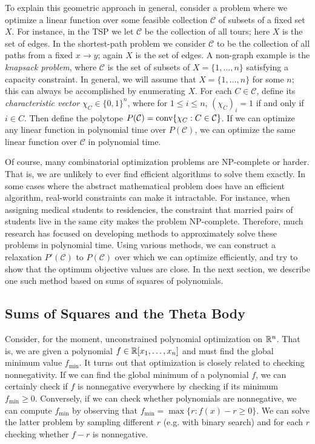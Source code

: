 To explain this geometric approach in general, consider a problem where we optimize a linear function over some feasible collection $\mathcal{C}$ of subsets of a fixed set $X$.
For instance, in the TSP we let $\mathcal{C}$ be the collection of all tours; here $X$ is the set of edges.
In the shortest-path problem we consider $\mathcal{C}$ to be the collection of all paths from a fixed $x \to y$; again $X$ is the set of edges.
A non-graph example is the {\em knapsack problem}, where $\mathcal{C}$ is the set of subsets of $X = \{1, \ldots, n\}$ satisfying a capacity constraint.
In general, we will assume that $X = \{1, \ldots, n\}$ for some $n$; this can always be accomplished by enumerating $X$.
For each $C \in \mathcal{C}$, define its {\em characteristic vector} $\chi_C \in \{0,1\}^n$, where for $1 \le i \le n$, $(\chi_C)_i = 1$ if and only if $i \in C$.
Then define the polytope $P(\mathcal{C}) = \hbox{conv} \{\chi_C: C \in \mathcal{C}\}$.
If we can optimize any linear function in polynomial time over $P(\mathcal{C})$, we can optimize the same linear function over $\mathcal{C}$ in polynomial time. 

Of course, many combinatorial optimization problems are NP-complete or harder. 
That is, we are unlikely to ever find efficient algorithms to solve them exactly.
In some cases where the abstract mathematical problem does have an efficient algorithm, real-world constraints can make it intractable. 
For instance, when assigning medical students to residencies, the constraint that married pairs of students live in the same city makes the problem NP-complete.
Therefore, much research has focused on developing methods to approximately solve these problems in polynomial time. 
Using various methods, we can construct a relaxation $P'(\mathcal{C})$ to $ P(\mathcal{C})$ over which we can optimize efficiently, and try to show that the optimum objective values are close.
In the next section, we describe one such method based on sums of squares of polynomials.

\subsection{Sums of Squares and the Theta Body}
\label{section:introtheta}
Consider, for the moment, unconstrained polynomial optimization on $\mathbb{R}^n$. 
That is, we are given a polynomial $f \in \mathbb{R}[x_1, \ldots, x_n]$ and must find the global minimum value $f_{\min}$. 
It turns out that optimization is closely related to checking nonnegativity.
If we can find the global minimum of a polynomial $f$, we can certainly check if $f$ is nonnegative everywhere by checking if its minimum $f_{\min} \ge 0$.
Conversely, if we can check whether polynomials are nonnegative, we can compute $f_{\min}$ by observing that $f_{\min} = \max \{r: f(x) - r \ge 0\}$. 
We can solve the latter problem by sampling different $r$ (e.g. with binary search) and for each $r$ checking whether $f - r$ is nonnegative.

